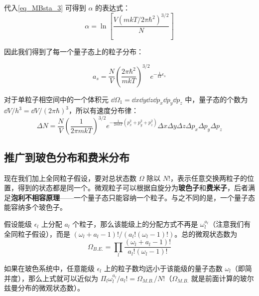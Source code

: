 代入\autoref{eq_MBsta_3} 可得到 $\alpha$ 的表达式：
\begin{equation}\label{eq_MBsta_8}
\alpha=\ln\left[\frac{V(m k T/2\pi \hbar^2)^{3/2}}{N}\right]
\end{equation}

因此我们得到了每一个量子态上的粒子分布：

\begin{equation}
a_s=\frac{N}{V}\left(\frac{2\pi \hbar^2}{m k T}\right)^{3/2} e^{-\frac{1}{k T}\epsilon_s}
\end{equation}

对于单粒子相空间中的一个体积元 $\dd \Omega_1=\dd x\dd y\dd z\dd p_x\dd p_y\dd p_z$ 中，量子态的个数为 $\dd V/h^3=\dd V/(2\pi \hbar)^3$，所以有速度分布律：
\begin{equation}
\Delta N=\frac{N}{V}\left(\frac{1}{2\pi m k T}\right)^{3/2}e^{-\frac{1}{2mk T}(p_x^2+p_y^2+p_z^2)}\Delta x\Delta y\Delta z\Delta p_x\Delta p_y\Delta p_z
\end{equation}

\subsection{推广到玻色分布和费米分布}

现在我们加上全同粒子假设，要对总状态数 $\Omega$ 除以 $N!$，表示任意交换两粒子的位置，得到的状态都是同一个。微观粒子可以根据自旋分为\textbf{玻色子}和\textbf{费米子}，后者满足\textbf{泡利不相容原理}——一个量子态只能容纳一个粒子。与之不同的是，一个量子态能容纳多个玻色子。

假设能级 $\epsilon_l$ 上分配 $a_l$ 个粒子，那么该能级上的分配方式不再是 $\omega_l^{a_l}$（注意我们有全同粒子假设），而是 $(\omega_l+a_l-1)!/(a_l!(\omega_l-1)!)$。总的微观状态数为
\begin{equation}
\Omega_{B.E.}=\prod_l \frac{(\omega_l+a_l-1)!}{a_l!(\omega_l-1)!}
\end{equation}

如果在玻色系统中，任意能级 $\epsilon_l$ 上的粒子数均远小于该能级的量子态数 $\omega_l$（即简并度），那么上式就可以近似为 $\Pi_l \omega_l^{a_l}/a_l!=\Omega_{M.B.}/N!$（$\Omega_{M.B.}$ 就是前面计算的玻尔兹曼分布的微观状态数）。

